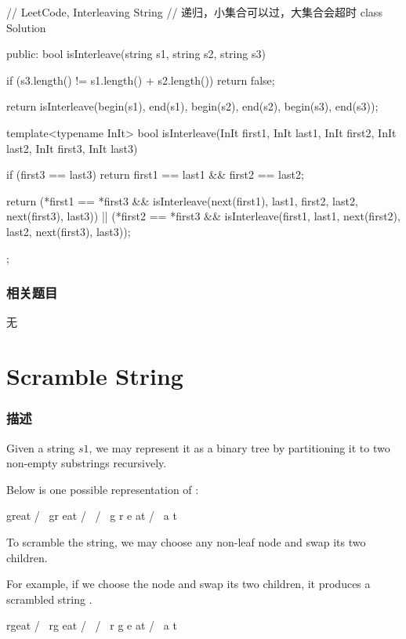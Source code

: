 \begin{Code}
// LeetCode, Interleaving String
// 递归，小集合可以过，大集合会超时
class Solution {
public:
    bool isInterleave(string s1, string s2, string s3) {
        if (s3.length() != s1.length() + s2.length())
            return false;

        return isInterleave(begin(s1), end(s1), begin(s2), end(s2),
                begin(s3), end(s3));
    }

    template<typename InIt>
    bool isInterleave(InIt first1, InIt last1, InIt first2, InIt last2,
            InIt first3, InIt last3) {
        if (first3 == last3)
            return first1 == last1 && first2 == last2;

        return (*first1 == *first3
                && isInterleave(next(first1), last1, first2, last2,
                        next(first3), last3))
                || (*first2 == *first3
                        && isInterleave(first1, last1, next(first2), last2,
                                next(first3), last3));
    }
};
\end{Code}

\subsubsection{相关题目}
\begindot
\item 无
\myenddot


\section{Scramble String} %
\label{sec:scramble-string}


\subsubsection{描述}
Given a string $s1$, we may represent it as a binary tree by partitioning it to two non-empty substrings recursively.

Below is one possible representation of :
\begin{Code}
    great
   /    \
  gr    eat
 / \    /  \
g   r  e   at
           / \
          a   t
\end{Code}

To scramble the string, we may choose any non-leaf node and swap its two children.

For example, if we choose the node  and swap its two children, it produces a scrambled string .
\begin{Code}
    rgeat
   /    \
  rg    eat
 / \    /  \
r   g  e   at
           / \
          a   t
\end{Code}

